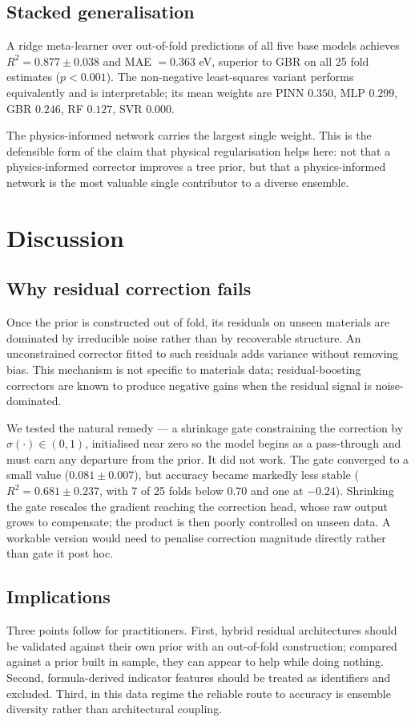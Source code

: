 \documentclass[journal]{IEEEtran}
\begin{document}
\subsection{Stacked generalisation}
A ridge meta-learner over out-of-fold predictions of all five base models
achieves $R^2 = 0.877 \pm 0.038$ and MAE $= 0.363$ eV, superior to GBR on all 25
fold estimates ($p < 0.001$). The non-negative least-squares variant performs
equivalently and is interpretable; its mean weights are PINN $0.350$, MLP
$0.299$, GBR $0.246$, RF $0.127$, SVR $0.000$.

The physics-informed network carries the largest single weight. This is the
defensible form of the claim that physical regularisation helps here: not that a
physics-informed corrector improves a tree prior, but that a physics-informed
network is the most valuable single contributor to a diverse ensemble.

\section{Discussion}

\subsection{Why residual correction fails}
Once the prior is constructed out of fold, its residuals on unseen materials are
dominated by irreducible noise rather than by recoverable structure. An
unconstrained corrector fitted to such residuals adds variance without removing
bias. This mechanism is not specific to materials data; residual-boosting
correctors are known to produce negative gains when the residual signal is
noise-dominated.

We tested the natural remedy --- a shrinkage gate constraining the correction by
$\sigma(\cdot) \in (0,1)$, initialised near zero so the model begins as a
pass-through and must earn any departure from the prior. It did not work. The
gate converged to a small value ($0.081 \pm 0.007$), but accuracy became
markedly less stable ($R^2 = 0.681 \pm 0.237$, with 7 of 25 folds below $0.70$
and one at $-0.24$). Shrinking the gate rescales the gradient reaching the
correction head, whose raw output grows to compensate; the product is then
poorly controlled on unseen data. A workable version would need to penalise
correction magnitude directly rather than gate it post hoc.

\subsection{Implications}
Three points follow for practitioners. First, hybrid residual architectures
should be validated against their own prior with an out-of-fold construction;
compared against a prior built in sample, they can appear to help while doing
nothing. Second, formula-derived indicator features should be treated as
identifiers and excluded. Third, in this data regime the reliable route to
accuracy is ensemble diversity rather than architectural coupling.
\end{document}
